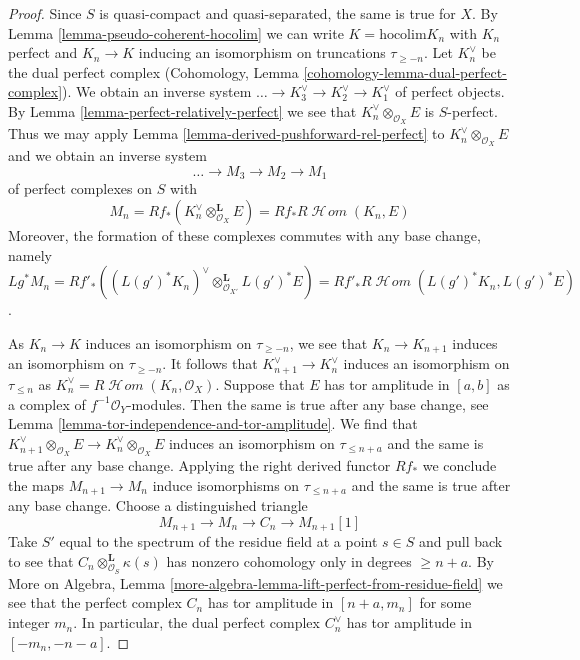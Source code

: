 \documentclass{stacks-project}
\theoremstyle{plain}
\theoremstyle{definition}
\theoremstyle{remark}
\numberwithin{equation}{subsection}
\def\SheafHom{\mathop{\mathcal{H}\!\mathit{om}}\nolimits}
\begin{document}
\begin{proof}
Since $S$ is quasi-compact and quasi-separated, the same is true for $X$.
By Lemma \ref{lemma-pseudo-coherent-hocolim} we can write
$K = \text{hocolim} K_n$ with $K_n$ perfect and $K_n \to K$ inducing
an isomorphism on truncations $\tau_{\geq -n}$. Let $K_n^\vee$
be the dual perfect complex
(Cohomology, Lemma \ref{cohomology-lemma-dual-perfect-complex}).
We obtain an inverse system $\ldots \to K_3^\vee \to K_2^\vee \to K_1^\vee$
of perfect objects. By Lemma \ref{lemma-perfect-relatively-perfect}
we see that $K_n^\vee \otimes_{\mathcal{O}_X} E$ is $S$-perfect.
Thus we may apply Lemma \ref{lemma-derived-pushforward-rel-perfect}
to $K_n^\vee \otimes_{\mathcal{O}_X} E$ and we obtain an inverse system
$$
\ldots \to M_3 \to M_2 \to M_1
$$
of perfect complexes on $S$ with
$$
M_n = Rf_*(K_n^\vee \otimes_{\mathcal{O}_X}^\mathbf{L} E) =
Rf_*R\SheafHom(K_n, E)
$$
Moreover, the formation of these complexes commutes with any
base change, namely $Lg^*M_n =
Rf'_*((L(g')^*K_n)^\vee \otimes_{\mathcal{O}_{X'}}^\mathbf{L} L(g')^*E) =
Rf'_*R\SheafHom(L(g')^*K_n, L(g')^*E)$.

\medskip\noindent
As $K_n \to K$ induces an isomorphism on $\tau_{\geq -n}$, we see that
$K_n \to K_{n + 1}$ induces an isomorphism on $\tau_{\geq -n}$.
It follows that $K_{n + 1}^\vee \to K_n^\vee$
induces an isomorphism on $\tau_{\leq n}$ as
$K_n^\vee = R\SheafHom(K_n, \mathcal{O}_X)$.
Suppose that $E$ has tor amplitude in $[a, b]$ as a complex
of $f^{-1}\mathcal{O}_Y$-modules. Then the same is true after
any base change, see Lemma \ref{lemma-tor-independence-and-tor-amplitude}.
We find that
$K_{n + 1}^\vee \otimes_{\mathcal{O}_X} E \to
K_n^\vee \otimes_{\mathcal{O}_X} E$
induces an isomorphism on $\tau_{\leq n + a}$
and the same is true after any base change.
Applying the right derived functor $Rf_*$
we conclude the maps $M_{n + 1} \to M_n$
induce isomorphisms on $\tau_{\leq n + a}$
and the same is true after any base change.
Choose a distinguished triangle
$$
M_{n + 1} \to M_n \to C_n \to M_{n + 1}[1]
$$
Take $S'$ equal to the spectrum of the residue field at a point
$s \in S$ and pull back to see that
$C_n \otimes_{\mathcal{O}_S}^\mathbf{L} \kappa(s)$
has nonzero cohomology only in degrees $\geq n + a$. By
More on Algebra, Lemma
\ref{more-algebra-lemma-lift-perfect-from-residue-field}
we see that the perfect complex $C_n$ has tor amplitude in
$[n + a, m_n]$ for some integer $m_n$.
In particular, the dual perfect complex $C_n^\vee$ has tor amplitude in
$[-m_n, -n - a]$.


\end{proof}
\end{document}
